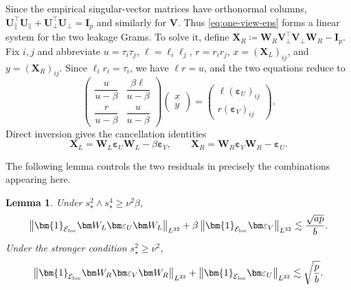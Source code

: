 \documentclass[11pt]{article}
\newtheorem{lemma}{Lemma}
\newcommand{\ind}{\bm{1}}
\newcommand{\trans}{\top}
\newcommand{\Lqn}[2]{\left\lVert #1\right\rVert_{L^{#2}}}
\newcommand{\cE}{\mathcal{E}}
\begin{document}
Since the empirical singular-vector matrices have orthonormal columns,
$\bm U_\parallel^\trans\bm U_\parallel+
\bm U_\perp^\trans\bm U_\perp=\bm I_p$ and similarly for $\bm V$.
Thus \cref{eq:one-view-eps} forms a linear system for the two leakage
Grams. To solve it, define
$\bm X_R\coloneqq
\bm W_R\bm V_\perp^\trans\bm V_\perp\bm W_R-\bm I_p$.
Fix $i,j$ and abbreviate
$u=\tau_i\tau_j$, $\ell=\ell_i\ell_j$, $r=r_ir_j$,
$x=(\bm X_L)_{ij}$, and $y=(\bm X_R)_{ij}$.
Since $\ell_ir_i=\tau_i$, we have $\ell r=u$, and the two equations reduce to
\begin{equation}
\label{eq:one-view-entrywise-system}
  \begin{pmatrix}
    \dfrac{u}{u-\beta}
    &
    \dfrac{\beta\ell}{u-\beta}
    \\[5pt]
    \dfrac{r}{u-\beta}
    &
    \dfrac{u}{u-\beta}
  \end{pmatrix}
  \begin{pmatrix}
    x\\y
  \end{pmatrix}
  =
  \begin{pmatrix}
    \ell(\bm\varepsilon_U)_{ij}\\
    r(\bm\varepsilon_V)_{ij}
  \end{pmatrix}.
\end{equation}
Direct inversion gives the cancellation identities
\begin{equation}
\label{eq:one-view-cancellation}
  {
  \bm X_L
  =
  \bm W_L\bm\varepsilon_U\bm W_L-\beta\bm\varepsilon_V,
  \qquad
  \bm X_R
  =
  \bm W_R\bm\varepsilon_V\bm W_R-\bm\varepsilon_U.}
\end{equation}

The following lemma controls the two residuals in precisely the combinations
appearing here.

\begin{lemma}
\label{lem:one-view-gram-approximation}
Under $s_\star^2\wedge s_\star^4\ge\nu^2\beta$,
\begin{equation}
\label{eq:one-view-left-error-bound}
  \Lqn{
    \ind_{\cE_{\rm loc}}
    \bm W_L\bm\varepsilon_U\bm W_L
  }{32}
  +
  \beta
  \Lqn{
    \ind_{\cE_{\rm loc}}\bm\varepsilon_V
  }{32}
  \lesssim
  \frac{\sqrt{ap}}b.
\end{equation}
Under the stronger condition $s_\star^2\ge\nu^2$,
\begin{equation}
\label{eq:one-view-right-error-bound}
  \Lqn{
    \ind_{\cE_{\rm loc}}
    \bm W_R\bm\varepsilon_V\bm W_R
  }{32}
  +
  \Lqn{
    \ind_{\cE_{\rm loc}}\bm\varepsilon_U
  }{32}
  \lesssim
  \sqrt{\frac pb}.
\end{equation}
\end{lemma}
\end{document}
